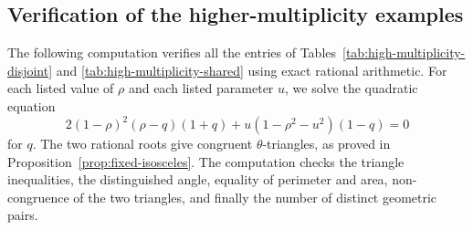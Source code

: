 \documentclass[11pt]{amsart}
\theoremstyle{plain}
\theoremstyle{remark}
\theoremstyle{plain}
\begin{document}
\subsection{Verification of the higher-multiplicity examples}
\label{app:high-multiplicity}

The following computation verifies all the entries of
Tables~\ref{tab:high-multiplicity-disjoint} and
\ref{tab:high-multiplicity-shared} using exact rational arithmetic.
For each listed value of $\rho$ and each listed parameter $u$, we solve
the quadratic equation
\[
2(1-\rho)^2(\rho-q)(1+q)
+
u(1-\rho^2-u^2)(1-q)=0
\]
for $q$. The two rational roots give congruent $\theta$-triangles, as
proved in Proposition~\ref{prop:fixed-isosceles}. The computation
checks the triangle inequalities, the distinguished angle, equality of
perimeter and area, non-congruence of the two triangles, and finally
the number of distinct geometric pairs.
\end{document}
